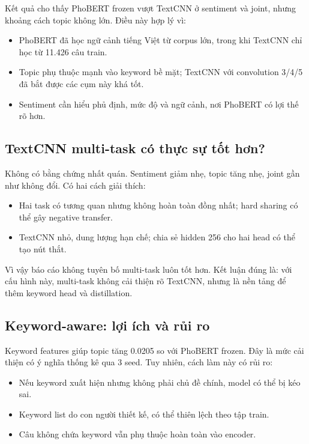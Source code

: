 \documentclass[12pt,a4paper]{report}
\begin{document}
Kết quả cho thấy PhoBERT frozen vượt TextCNN ở sentiment và joint, nhưng khoảng cách topic không lớn. Điều này hợp lý vì:

\begin{itemize}[leftmargin=1.2cm]
  \item PhoBERT đã học ngữ cảnh tiếng Việt từ corpus lớn, trong khi TextCNN chỉ học từ 11.426 câu train.
  \item Topic phụ thuộc mạnh vào keyword bề mặt; TextCNN với convolution 3/4/5 đã bắt được các cụm này khá tốt.
  \item Sentiment cần hiểu phủ định, mức độ và ngữ cảnh, nơi PhoBERT có lợi thế rõ hơn.
\end{itemize}

\subsection{TextCNN multi-task có thực sự tốt hơn?}

Không có bằng chứng nhất quán. Sentiment giảm nhẹ, topic tăng nhẹ, joint gần như không đổi. Có hai cách giải thích:

\begin{itemize}[leftmargin=1.2cm]
  \item Hai task có tương quan nhưng không hoàn toàn đồng nhất; hard sharing có thể gây negative transfer.
  \item TextCNN nhỏ, dung lượng hạn chế; chia sẻ hidden 256 cho hai head có thể tạo nút thắt.
\end{itemize}

Vì vậy báo cáo không tuyên bố multi-task luôn tốt hơn. Kết luận đúng là: với cấu hình này, multi-task không cải thiện rõ TextCNN, nhưng là nền tảng để thêm keyword head và distillation.

\subsection{Keyword-aware: lợi ích và rủi ro}

Keyword features giúp topic tăng 0.0205 so với PhoBERT frozen. Đây là mức cải thiện có ý nghĩa thống kê qua 3 seed. Tuy nhiên, cách làm này có rủi ro:

\begin{itemize}[leftmargin=1.2cm]
  \item Nếu keyword xuất hiện nhưng không phải chủ đề chính, model có thể bị kéo sai.
  \item Keyword list do con người thiết kế, có thể thiên lệch theo tập train.
  \item Câu không chứa keyword vẫn phụ thuộc hoàn toàn vào encoder.
\end{itemize}
\end{document}

